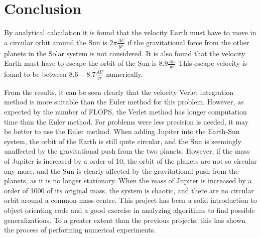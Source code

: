 \section{Conclusion}

By analytical calculation it is found that the velocity Earth must have to move in a circular orbit around the Sun is $2 \pi \frac{AU}{yr}$ if the gravitational force from the other planets in the Solar system is not considered. It is also found that the velocity Earth must have to escape the orbit of the Sun is $8.9 \frac{AU}{yr}$ This escape velocity is found to be between $8.6-8.7 \frac{AU}{yr}$ numerically. 

From the results, it can be seen clearly that the velocity Verlet integration method is more suitable than the Euler method for this problem. However, as expected by the number of FLOPS, the Verlet method has longer computation time than the Euler method. For problems were less precision is needed, it may be better to use the Euler method. 
\newline
When adding Jupiter into the Earth-Sun system, the orbit of the Earth is still quite circular, and the Sun is seemingly unaffected by the gravitational push from the two planets. However, if the mass of Jupiter is increased by a order of 10, the orbit of the planets are not so circular any more, and the Sun is clearly affected by the gravitational push from the planets, as it is no longer stationary. When the mass of Jupiter is increased by a order of 1000 of its original mass, the system is chaotic, and there are no circular orbit around a common mass centre. 
\newline
This project has been a solid introduction to object orienting code and a good exercise in
analyzing algorithms to find possible generalizations. To a greater extent than the previous
projects, this has shown the process of performing numerical experiments.
